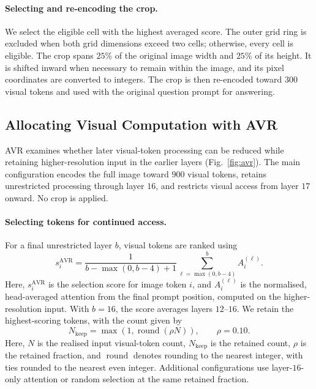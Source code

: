\documentclass{article} %
\begin{document}
\paragraph{Selecting and re-encoding the crop.}
We select the eligible cell with the highest averaged score. The outer
grid ring is excluded when both grid dimensions exceed two cells;
otherwise, every cell is eligible. The crop spans \(25\%\) of the
original image width and \(25\%\) of its height. It is shifted inward
when necessary to remain within the image, and its pixel coordinates
are converted to integers. The crop is then re-encoded toward \(300\)
visual tokens and used with the original question prompt for answering.

\subsection{Allocating Visual Computation with AVR}
\label{sec:avr_method}

AVR examines whether later visual-token processing can be reduced while
retaining higher-resolution input in the earlier layers (Fig.~\ref{fig:avr}). The main
configuration encodes the full image toward \(900\) visual tokens,
retains unrestricted processing through layer \(16\), and restricts
visual access from layer \(17\) onward. No crop is applied.

\paragraph{Selecting tokens for continued access.}
For a final unrestricted layer \(b\), visual tokens are ranked using
\begin{equation}
    s_i^{\mathrm{AVR}} =
    \frac{1}{b-\max(0,b-4)+1}
    \sum_{\ell=\max(0,b-4)}^{b} A_i^{(\ell)}.
\end{equation}
Here, \(s_i^{\mathrm{AVR}}\) is the selection score for image token
\(i\), and \(A_i^{(\ell)}\) is the normalised, head-averaged attention
from the final prompt position, computed on the higher-resolution
input. With \(b=16\), the score averages layers \(12\)--\(16\).
We retain the highest-scoring tokens, with the count given by
\begin{equation}
    N_{\mathrm{keep}} = \max(1,\operatorname{round}(\rho N)),
    \qquad \rho=0.10.
\end{equation}
Here, \(N\) is the realised input visual-token count,
\(N_{\mathrm{keep}}\) is the retained count, \(\rho\) is the retained
fraction, and \(\operatorname{round}\) denotes rounding to the nearest
integer, with ties rounded to the nearest even integer. Additional configurations use
layer-\(16\)-only attention or random selection at the same retained
fraction.
\end{document}
